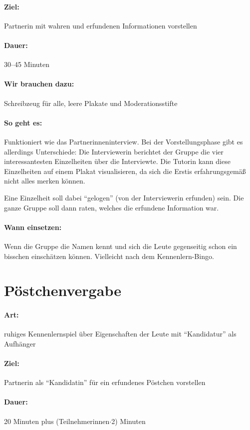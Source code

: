 \paragraph{Ziel:} Partnerin mit wahren und erfundenen Informationen vorstellen
\paragraph{Dauer:} 30--45 Minuten
\paragraph{Wir brauchen dazu:} Schreibzeug für alle, leere Plakate und Moderationsstifte
\paragraph{So geht es:} Funktioniert wie das Partnerinneninterview. Bei der Vorstellungsphase gibt es allerdings Unterschiede:
Die Interviewerin berichtet der Gruppe die vier interessantesten Einzelheiten über die Interviewte. Die Tutorin kann diese Einzelheiten auf einem Plakat visualisieren, da sich die Erstis erfahrungsgemäß nicht alles merken können.

Eine Einzelheit soll dabei "`gelogen"' (von der Interviewerin erfunden) sein. Die ganze Gruppe soll dann raten, welches die erfundene Information war.
\paragraph{Wann einsetzen:} Wenn die Gruppe die Namen kennt und sich die Leute gegenseitig schon ein bisschen einschätzen können. Vielleicht nach dem Kennenlern-Bingo.

\section{Pöstchenvergabe}
\label{poestchenvergabe}
\paragraph{Art:} ruhiges Kennenlernspiel über Eigenschaften der Leute mit "`Kandidatur"' als Aufhänger
\paragraph{Ziel:} Partnerin als "`Kandidatin"' für ein erfundenes Pöstchen vorstellen
\paragraph{Dauer:} 20 Minuten plus (Teilnehmerinnen$\cdot$2) Minuten
